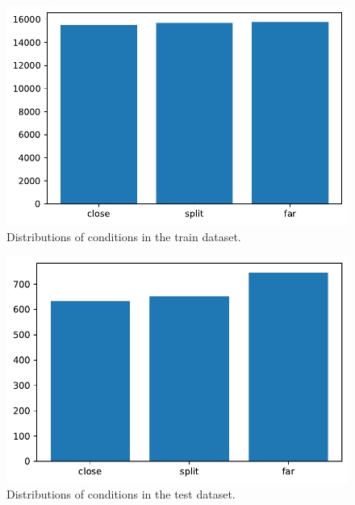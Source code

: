 \clearpage

\begin{figure}[ht]
  \centering
  \includegraphics[width=\columnwidth]{assets/trainset_conditions.pdf}
  \caption[Train dataset words]{Distributions of conditions in the train dataset.}
  \label{figure:trainset-conditions}
\end{figure}

\begin{figure}[ht]
  \centering
  \includegraphics[width=\columnwidth]{assets/testset_conditions.pdf}
  \caption[Test dataset words]{Distributions of conditions in the test dataset.}
  \label{figure:testset-conditions}
\end{figure}
